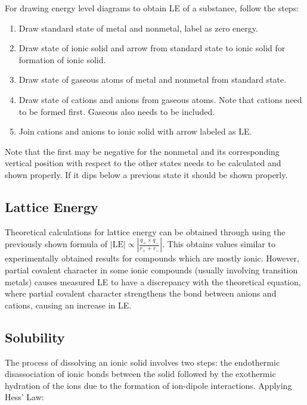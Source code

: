 \documentclass[../main]{subfiles}
\begin{document}
	For drawing energy level diagrams to obtain LE of a substance, follow the steps:
	\begin{enumerate}
		\item Draw standard state of metal and nonmetal, label as zero energy.
		\item Draw state of ionic solid and arrow from standard state to ionic solid for formation of ionic solid.
		\item Draw state of gaseous atoms of metal and nonmetal from standard state.
		\item Draw state of cations and anions from gaseous atoms. Note that cations need to be formed first. Gaseous  also needs to be included.
		\item Join cations and anions to ionic solid with arrow labeled as LE.
	\end{enumerate}

	Note that the first  may be negative for the nonmetal and its corresponding vertical position with respect to the other states needs to be calculated and shown properly. If it dips below a previous state it should be shown properly.

	\subsection{Lattice Energy}

	Theoretical calculations for lattice energy can be obtained through using the previously shown formula of \(| \text{LE} | \propto | \frac{q_+ \times q_-}{r_+ + r_-} | \). This obtains values similar to experimentally obtained results for compounds which are mostly ionic. However, partial covalent character in some ionic compounds (usually involving transition metals) causes measured LE to have a discrepancy with the theoretical equation, where partial covalent character strengthens the bond between anions and cations, causing an increase in LE.

	\subsection{Solubility}

	The process of dissolving an ionic solid involves two steps: the endothermic disassociation of ionic bonds between the solid followed by the exothermic hydration of the ions due to the formation of ion-dipole interactions. Applying Hess' Law:

\end{document}
